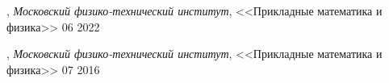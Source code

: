 
, \textit{Московский физико-технический институт},  <<Прикладные математика и  физика>>	\hfill 06 2022

, \textit{Московский физико-технический институт}, <<Прикладные математика и  физика>> \hfill	07 2016




